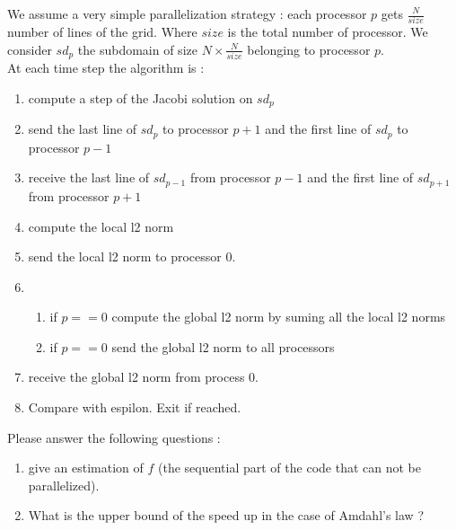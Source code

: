 \documentclass[11pt,a4paper]{article}
\begin{document}
\begin{exercise}
  $~$ %
\\

We assume a very simple parallelization strategy : each processor $p$ gets $\frac{N}{size}$ number of lines of the grid. Where $size$ is the total number of processor. We consider $sd_{p}$ the subdomain of size $N \times \frac{N}{size}$ belonging to processor $p$. 
\\

At each time step the algorithm is :

\begin{enumerate}

	\item compute a step of the Jacobi solution on $sd_{p}$

	\item send the last line of $sd_{p}$ to processor $p+1$ and the first line of $sd_{p}$ to processor $p-1$

	\item receive the last line of $sd_{p-1}$ from processor $p-1$ and the first line of $sd_{p+1}$ from processor $p+1$

	\item compute the local l2 norm

	\item send the local l2 norm to processor 0.

	\item  \begin{enumerate} \item{if $p == 0$ compute the global l2 norm by suming all the local l2 norms} \item{if $p==0$ send the global l2 norm to all processors} \end{enumerate}

	\item receive the global l2 norm from process 0. 

	\item Compare with espilon. Exit if reached. 

\end{enumerate}

Please answer the following questions :

\begin{enumerate}[label=(\alph*)]

	\item give an estimation of $f$ (the sequential part of the code that can not be parallelized). 

	\item What is the upper bound of the speed up in the case of Amdahl's law ? 

\end{enumerate}
  

\end{exercise}
\end{document}
